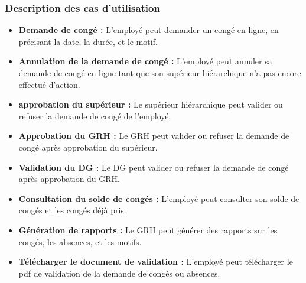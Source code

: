 \subsubsection{Description des cas d'utilisation}
\begin{itemize}
    \item \textbf{Demande de congé :} L'employé peut demander un congé en ligne, en précisant la date, la durée, et le motif.
    \item \textbf{Annulation de la demande de congé :} L'employé peut annuler sa demande de congé en ligne tant que son supérieur hiérarchique n'a pas encore effectué d'action.
    \item \textbf{approbation du supérieur :} Le supérieur hiérarchique peut valider ou refuser la demande de congé de l'employé.
    \item \textbf{Approbation du GRH :} Le GRH peut valider ou refuser la demande de congé après approbation du supérieur.
    \item \textbf{Validation du DG :} Le DG peut valider ou refuser la demande de congé après approbation du GRH.
    \item \textbf{Consultation du solde de congés :} L'employé peut consulter son solde de congés et les congés déjà pris.
    \item \textbf{Génération de rapports :} Le GRH peut générer des rapports sur les congés, les absences, et les motifs.
    \item \textbf{Télécharger le document de validation :} L'employé peut télécharger le pdf de validation de la demande de congés ou absences.
\end{itemize}
